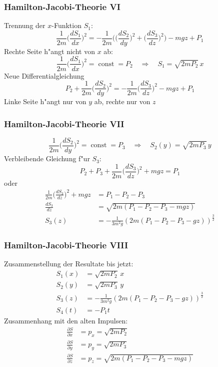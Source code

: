 \documentclass{beamer}
\begin{document}
\begin{frame}
\frametitle{Hamilton-Jacobi-Theorie VI}

Trennung der $x$-Funktion $S_1$:
\[
\frac1{2m}
\biggl(\frac{dS_1}{dx}\biggr)^2
=-\frac1{2m}\biggl(
\biggl(\frac{dS_2}{dy}\biggr)^2
+
\biggl(\frac{dS_3}{dz}\biggr)^2
\biggr)
-mgz
+P_1
\]
Rechte Seite h"angt nicht von $x$ ab:
\[
\frac1{2m}\biggl(\frac{dS_1}{dx}\biggr)^2=\operatorname{const}=P_2
\quad\Rightarrow\quad
S_1=\sqrt{2mP_2}\, x
\]
Neue Differentialgleichung
\[
P_2+\frac1{2m}\biggl(\frac{dS_2}{dy}\biggr)^2
=
-\frac1{2m}\biggl(\frac{dS_3}{dz}\biggr)^2-mgz
+P_1
\]
Linke Seite h"angt nur von $y$ ab, rechte nur von $z$

\end{frame}

\begin{frame}
\frametitle{Hamilton-Jacobi-Theorie VII}
\[
\frac1{2m}\biggl(\frac{dS_2}{dy}\biggr)^2=\operatorname{const}=P_3
\quad \Rightarrow\quad
S_2(y)=\sqrt{2mP_3}\,y
\]
Verbleibende Gleichung f"ur $S_3$:
\[
P_2+P_3+
\frac1{2m}\biggl(\frac{dS_3}{dz}\biggr)^2+mgz=P_1
\]
oder
\begin{align*}
\frac1{2m}\biggl(\frac{dS_3}{dz}\biggr)^2+mgz&=P_1 -P_2-P_3
\\
\frac{dS_3}{dz}&=\sqrt{2m(P_1-P_2-P_3-mgz)}
\\
S_3(z)&=-\frac1{3m^2g}(2m(P_1-P_2-P_3-gz))^{\frac32}
\end{align*}

\end{frame}

\begin{frame}
\frametitle{Hamilton-Jacobi-Theorie VIII}

Zusammenstellung der Resultate bis jetzt:
\begin{align*}
S_1(x)&=\sqrt{2mP_2}\, x
\\
S_2(y)&=\sqrt{2mP_3}\, y
\\
S_3(z)&=-\frac1{3m^2g}(2m(P_1-P_2-P_3-gz))^{\frac32}
\\
S_4(t)&=-P_1t
\end{align*}
Zusammenhang mit den alten Impulsen:
\begin{align*}
\frac{\partial S}{\partial x}&=p_x=\sqrt{2mP_2}
\\
\frac{\partial S}{\partial y}&=p_y=\sqrt{2mP_3}
\\
\frac{\partial S}{\partial z}&=p_z=\sqrt{2m(P_1-P_2-P_3-mgz)}
\end{align*}

\end{frame}
\end{document}

